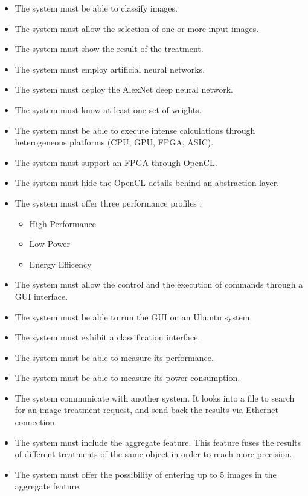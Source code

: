 \documentclass[parskip=full]{scrartcl}
\begin{document}
\begin{itemize}
	\item The system must be able to classify images.
	\item The system must allow the selection of one or more input images.
	\item The system must show the result of the treatment.
	\item The system must employ artificial neural networks.
	\item The system must deploy the AlexNet deep neural network.
	\item The system must know at least one set of weights.
	\item The system must be able to execute intense calculations through heterogeneous platforms (CPU, GPU, FPGA, ASIC).
	\item The system must support an FPGA through OpenCL.
	\item The system must hide the OpenCL details behind an abstraction layer.
	\item The system must offer three performance profiles : 
	\begin{itemize}
		\item High Performance
		\item Low Power
		\item Energy Efficency
	\end{itemize}
	\item The system must allow the control and the execution of commands through a GUI interface.
	\item The system must be able to run the GUI on an Ubuntu system.
	\item The system must exhibit a classification interface.
	\item The system must be able to measure its performance.
	\item The system must be able to measure its power consumption.
	\item The system communicate with another system. It looks into a file to search for an image treatment request, and send back the results via Ethernet connection.
	\item The system must include the aggregate feature. This feature fuses the results of different treatments of the same object in order to reach more precision.
	\item The system must offer the possibility of entering up to 5 images in the aggregate feature.
\end{itemize}
\end{document}
